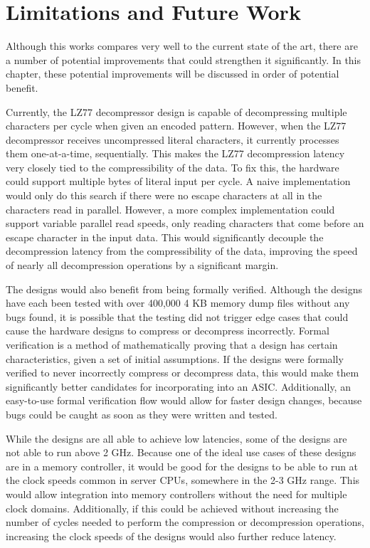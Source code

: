 \documentclass[doublespace,nopageskip]{VTthesis}
\begin{document}
\chapter{Limitations and Future Work} \label{ch:discussion}
Although this works compares very well to the current state of the art, there are a number of potential improvements that could strengthen it significantly. In this chapter, these potential improvements will be discussed in order of potential benefit.

Currently, the LZ77 decompressor design is capable of decompressing multiple characters per cycle when given an encoded pattern. However, when the LZ77 decompressor receives uncompressed literal characters, it currently processes them one-at-a-time, sequentially. This makes the LZ77 decompression latency very closely tied to the compressibility of the data. To fix this, the hardware could support multiple bytes of literal input per cycle. A naive implementation would only do this search if there were no escape characters at all in the characters read in parallel. However, a more complex implementation could support variable parallel read speeds, only reading characters that come before an escape character in the input data. This would significantly decouple the decompression latency from the compressibility of the data, improving the speed of nearly all decompression operations by a significant margin.

The designs would also benefit from being formally verified. Although the designs have each been tested with over 400,000 4 KB memory dump files without any bugs found, it is possible that the testing did not trigger edge cases that could cause the hardware designs to compress or decompress incorrectly. Formal verification is a method of mathematically proving that a design has certain characteristics, given a set of initial assumptions. If the designs were formally verified to never incorrectly compress or decompress data, this would make them significantly better candidates for incorporating into an ASIC. Additionally, an easy-to-use formal verification flow would allow for faster design changes, because bugs could be caught as soon as they were written and tested.

While the designs are all able to achieve low latencies, some of the designs are not able to run above 2 GHz. Because one of the ideal use cases of these designs are in a memory controller, it would be good for the designs to be able to run at the clock speeds common in server CPUs, somewhere in the 2-3 GHz range. This would allow integration into memory controllers without the need for multiple clock domains. Additionally, if this could be achieved without increasing the number of cycles needed to perform the compression or decompression operations, increasing the clock speeds of the designs would also further reduce latency.
\end{document}
